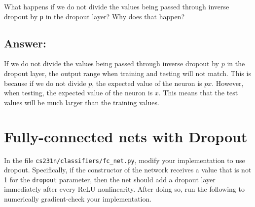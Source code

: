 \documentclass[11pt]{article}
\begin{document}
What happens if we do not divide the values being passed through inverse
dropout by \texttt{p} in the dropout layer? Why does that happen?

\hypertarget{answer}{%
\subsection{Answer:}\label{answer}}

If we do not divide the values being passed through inverse dropout by
\(p\) in the dropout layer, the output range when training and testing
will not match. This is because if we do not divide \(p\), the expected
value of the neuron is \(px\). However, when testing, the expected value
of the neuron is \(x\). This means that the test values will be much
larger than the training values.

    \hypertarget{fully-connected-nets-with-dropout}{%
\section{Fully-connected nets with
Dropout}\label{fully-connected-nets-with-dropout}}

In the file \texttt{cs231n/classifiers/fc\_net.py}, modify your
implementation to use dropout. Specifically, if the constructor of the
network receives a value that is not 1 for the \texttt{dropout}
parameter, then the net should add a dropout layer immediately after
every ReLU nonlinearity. After doing so, run the following to
numerically gradient-check your implementation.
\end{document}
